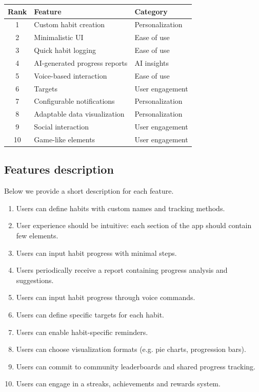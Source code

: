 \documentclass{article}
\begin{document}
\begin{table}[H]
    \centering
    \begin{tabularx}{0.9\textwidth}{c|X|X}
        \hline
        \textbf{Rank} & \textbf{Feature} & \textbf{Category} \\
        \hline
        1 & Custom habit creation & Personalization \\
        2 & Minimalistic UI & Ease of use \\
        3 & Quick habit logging & Ease of use \\
        4 & AI-generated progress reports & AI insights \\
        5 & Voice-based interaction & Ease of use \\
        6 & Targets & User engagement \\
        7 & Configurable notifications & Personalization \\
        8 & Adaptable data visualization & Personalization \\
        9 & Social interaction & User engagement \\
        10 & Game-like elements & User engagement \\
        \hline
    \end{tabularx}
\end{table}

\subsection{Features description}

Below we provide a short description for each feature.

\begin{enumerate}
    \item Users can define habits with custom names and tracking methods.
    \item User experience should be intuitive: each section of the app should contain few elements.
    \item Users can input habit progress with minimal steps.
    \item Users periodically receive a report containing progress analysis and suggestions.
    \item Users can input habit progress through voice commands.
    \item Users can define specific targets for each habit.
    \item Users can enable habit-specific reminders.
    \item Users can choose visualization formats (e.g. pie charts, progression bars).
    \item Users can commit to community leaderboards and shared progress tracking.
    \item Users can engage in a streaks, achievements and rewards system.
\end{enumerate}
\end{document}
